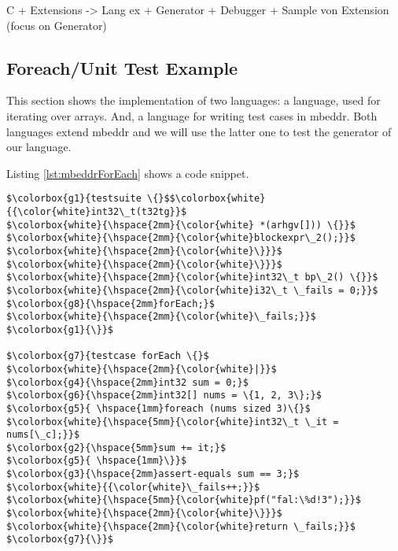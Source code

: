 C + Extensions 
	    -> Lang ex +  Generator + Debugger
		+ Sample von Extension (focus on Generator)
		
\subsection{Foreach/Unit Test Example}

This section shows the implementation of two languages: a  language,
used for iterating over arrays. And, a  language for writing test
cases in mbeddr. Both languages extend mbeddr and we will use the
latter one to test the generator of our  language.

Listing \ref{lst:mbeddrForEach} shows a code snippet.

\noindent 
\begin{minipage}[t]{120pt} 
\begin{lstlisting}[language=mbeddr]
$\colorbox{g1}{testsuite \{}$$\colorbox{white}{{\color{white}int32\_t(t32tg}}$
$\colorbox{white}{\hspace{2mm}{\color{white} *(arhgv[])) \{}}$
$\colorbox{white}{\hspace{2mm}{\color{white}blockexpr\_2();}}$
$\colorbox{white}{\hspace{2mm}{\color{white}\}}}$
$\colorbox{white}{\hspace{2mm}{\color{white}\}}}$
$\colorbox{white}{\hspace{2mm}{\color{white}int32\_t bp\_2() \{}}$ 
$\colorbox{white}{\hspace{2mm}{\color{white}i32\_t \_fails = 0;}}$
$\colorbox{g8}{\hspace{2mm}forEach;}$
$\colorbox{white}{\hspace{2mm}{\color{white}\_fails;}}$
$\colorbox{g1}{\}}$

$\colorbox{g7}{testcase forEach \{}$ 
$\colorbox{white}{\hspace{2mm}{\color{white}|}}$
$\colorbox{g4}{\hspace{2mm}int32 sum = 0;}$
$\colorbox{g6}{\hspace{2mm}int32[] nums = \{1, 2, 3\};}$
$\colorbox{g5}{	\hspace{1mm}foreach (nums sized 3)\{}$
$\colorbox{white}{\hspace{5mm}{\color{white}int32\_t \_it = nums[\_c];}}$
$\colorbox{g2}{\hspace{5mm}sum += it;}$
$\colorbox{g5}{	\hspace{1mm}\}}$
$\colorbox{g3}{\hspace{2mm}assert-equals sum == 3;}$
$\colorbox{white}{{\color{white}\_fails++;}}$
$\colorbox{white}{\hspace{5mm}{\color{white}pf("fal:\%d!3");}}$
$\colorbox{white}{\hspace{2mm}{\color{white}\}}}$
$\colorbox{white}{\hspace{2mm}{\color{white}return \_fails;}}$
$\colorbox{g7}{\}}$
\end{lstlisting}
\end{minipage} 
